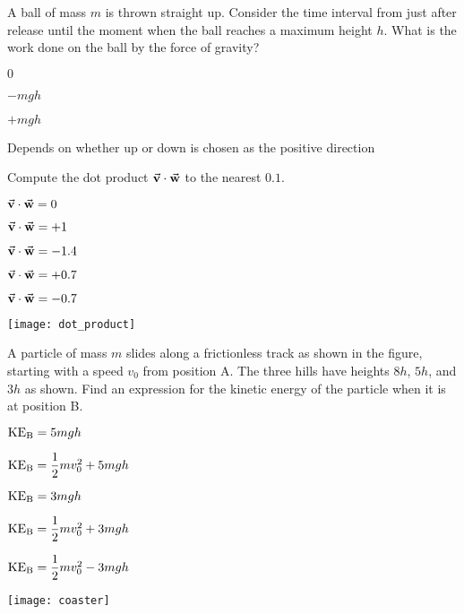 \documentclass[11pt]{article}
\begin{document}
\begin{enumerate}
\begin{minipage}[t]{\lw}
\item A ball of mass $m$ is thrown straight up. Consider the time interval from just after release until the moment when the ball reaches a maximum height $h$. What is the work done on the ball by the force of gravity?
\begin{choices}
\item $0$
\item $-mgh$
\item $+mgh$
\item Depends on whether up or down is chosen as the positive direction
\end{choices}
\end{minipage}

\begin{minipage}[t]{\lw}
\begin{minipage}[t]{.5\lw}
\item Compute the dot product $\vec{\bf v}\cdot\vec{\bf w}$ to the nearest $0.1$.
\begin{choices}
\item $\vec{\bf v}\cdot\vec{\bf w}=0$
\item $\vec{\bf v}\cdot\vec{\bf w}=+1$
\item $\vec{\bf v}\cdot\vec{\bf w}=-1.4$
\item $\vec{\bf v}\cdot\vec{\bf w}=+0.7$
\item $\vec{\bf v}\cdot\vec{\bf w}=-0.7$
\end{choices}
\end{minipage}\hfill
\begin{minipage}[t]{.45\lw}
\vspace{0in}
\flushright
\texttt{[image: dot\_product]}
\end{minipage}
\end{minipage}

\begin{minipage}[t]{\lw}
\item A particle of mass $m$ slides along a frictionless track as shown in the figure, starting with a speed $v_0$ from position A. The three hills have heights $8h$, $5h$, and $3h$ as shown. Find an expression for the kinetic energy of the particle when it is at position B.\\
\begin{minipage}[t]{.4\lw}
\begin{choices}
\item ${\rm KE}_{\rm B}=5mgh$
\item ${\rm KE}_{\rm B}=\dfrac{1}{2}mv_0^2+5mgh$
\item ${\rm KE}_{\rm B}=3mgh$
\item ${\rm KE}_{\rm B}=\dfrac{1}{2}mv_0^2+3mgh$
\item ${\rm KE}_{\rm B}=\dfrac{1}{2}mv_0^2-3mgh$
\end{choices}
\end{minipage}\hfill
\begin{minipage}[t]{.55\lw}
\vspace{0in}
\flushright
\texttt{[image: coaster]}
\end{minipage}
\end{minipage}


\end{enumerate}
\end{document}

